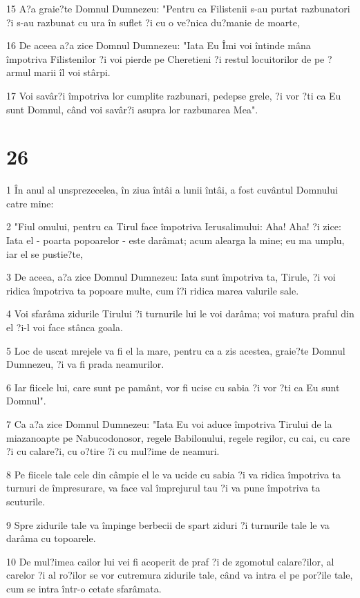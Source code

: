 \par 15 A?a graie?te Domnul Dumnezeu: "Pentru ca Filistenii s-au purtat razbunatori ?i s-au razbunat cu ura în suflet ?i cu o ve?nica du?manie de moarte,
\par 16 De aceea a?a zice Domnul Dumnezeu: "Iata Eu Îmi voi întinde mâna împotriva Filistenilor ?i voi pierde pe Cheretieni ?i restul locuitorilor de pe ?armul marii îl voi stârpi.
\par 17 Voi savâr?i împotriva lor cumplite razbunari, pedepse grele, ?i vor ?ti ca Eu sunt Domnul, când voi savâr?i asupra lor razbunarea Mea".

\chapter{26}

\par 1 În anul al unsprezecelea, în ziua întâi a lunii întâi, a fost cuvântul Domnului catre mine:
\par 2 "Fiul omului, pentru ca Tirul face împotriva Ierusalimului: Aha! Aha! ?i zice: Iata el - poarta popoarelor - este darâmat; acum alearga la mine; eu ma umplu, iar el se pustie?te,
\par 3 De aceea, a?a zice Domnul Dumnezeu: Iata sunt împotriva ta, Tirule, ?i voi ridica împotriva ta popoare multe, cum î?i ridica marea valurile sale.
\par 4 Voi sfarâma zidurile Tirului ?i turnurile lui le voi darâma; voi matura praful din el ?i-l voi face stânca goala.
\par 5 Loc de uscat mrejele va fi el la mare, pentru ca a zis acestea, graie?te Domnul Dumnezeu, ?i va fi prada neamurilor.
\par 6 Iar fiicele lui, care sunt pe pamânt, vor fi ucise cu sabia ?i vor ?ti ca Eu sunt Domnul".
\par 7 Ca a?a zice Domnul Dumnezeu: "Iata Eu voi aduce împotriva Tirului de la miazanoapte pe Nabucodonosor, regele Babilonului, regele regilor, cu cai, cu care ?i cu calare?i, cu o?tire ?i cu mul?ime de neamuri.
\par 8 Pe fiicele tale cele din câmpie el le va ucide cu sabia ?i va ridica împotriva ta turnuri de împresurare, va face val împrejurul tau ?i va pune împotriva ta scuturile.
\par 9 Spre zidurile tale va împinge berbecii de spart ziduri ?i turnurile tale le va darâma cu topoarele.
\par 10 De mul?imea cailor lui vei fi acoperit de praf ?i de zgomotul calare?ilor, al carelor ?i al ro?ilor se vor cutremura zidurile tale, când va intra el pe por?ile tale, cum se intra într-o cetate sfarâmata.
